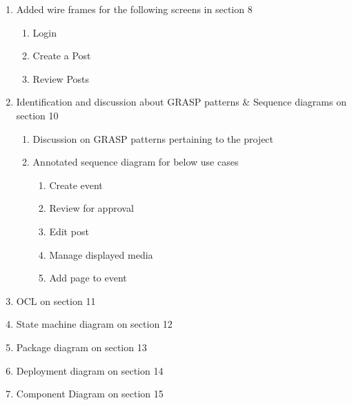 \begin{enumerate}
    \item Added wire frames for the following screens in section 8
    \begin{enumerate}
        \item Login
        \item Create a Post
        \item Review Posts
    \end{enumerate}
    \item Identification and discussion about GRASP patterns \& Sequence diagrams on section 10
    \begin{enumerate}
        \item Discussion on GRASP patterns pertaining to the project
        \item Annotated sequence diagram for below use cases
        \begin{enumerate}
            \item Create event
            \item Review for approval
            \item Edit post
            \item Manage displayed media
            \item Add page to event
        \end{enumerate}
    \end{enumerate}
    \item OCL on section 11
    \item State machine diagram on section 12
    \item Package diagram on section 13
    \item Deployment diagram on section 14
    \item Component Diagram on section 15
\end{enumerate}